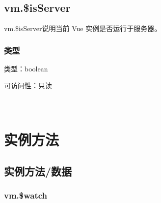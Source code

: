 \begin{lstlisting}[language=JavaScript]

\end{lstlisting}




\begin{lstlisting}[language=JavaScript]

\end{lstlisting}




\section{vm.\$isServer}

vm.\$isServer说明当前 Vue 实例是否运行于服务器。


\subsection{类型}


\begin{compactitem}
\item 类型：boolean
\item 可访问性：只读
\end{compactitem}


\begin{lstlisting}[language=JavaScript]

\end{lstlisting}




\begin{lstlisting}[language=JavaScript]

\end{lstlisting}




\begin{lstlisting}[language=JavaScript]

\end{lstlisting}




\chapter{实例方法}


\section{实例方法/数据}


\subsection{vm.\$watch}










